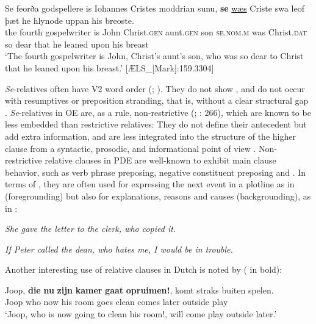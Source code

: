 \documentclass[output=paper,colorlinks,citecolor=brown]{langscibook}
\begin{document}
\ea\label{ex:los:5}
\gll Se feorða godspellere is Iohannes Cristes moddrian sunu, \textbf{se} \underline{wæs} Criste swa leof þæt he hlynode uppan his breoste.\\
the fourth gospelwriter is John Christ.\textsc{gen} aunt.\textsc{gen} son
\textsc{se.nom.m} was Christ.\textsc{dat} so dear that he leaned upon his breast \\
\glt ‘The fourth gospelwriter is John, Christ's aunt's son, who was so dear to Christ that he leaned upon his breast.' \hfill [ÆLS\_[Mark]:159.3304]
\z

\textit{Se}-relatives often have V2 word order (\citealt{Allen1977}; \citealt[149]{vanKemenade1987}). They do not show , and do not occur with resumptives or preposition stranding, that is, without a clear structural gap \citep{Wende1915, Allen1977}. \textit{Se}-relatives in OE are, as a rule, non-restrictive (\citealt[131--132, 138]{LosvanKemenade2018}; \citealt{Roma2007}: 266), which are known to be less embedded than restrictive relatives: They do not define their antecedent but add extra information, and are less integrated into the structure of the higher clause from a syntactic, prosodic, and informational point of view \citep[1034--1035]{HuddlestonPullum2002}. Non-restrictive relative clauses in PDE are well-known to exhibit main clause behavior, such as verb phrase preposing, negative constituent preposing and  \citep{Emonds1970, HooperHooper1973, Green1976, deVries2012, Heycock2017}. In terms of , they are often used for expressing the next event in a plotline as in  (foregrounding) but also for explanations, reasons and causes (backgrounding), as in :

\ea\label{ex:los:6}
{\itshape She gave the letter to the clerk, who copied it.} \hfill \citep[699]{Depraetere1996}
\z

\ea\label{ex:los:7}
{\itshape If Peter called the dean, who hates me, I would be in trouble.}\\ \hfill \citep[142]{JasinskajaPoschmann2020}
\z

Another interesting use of relative clauses in Dutch is noted by \citet[183]{deVries2012} ( in bold):

 \ea\label{ex:los:8}
\gll Joop, \textbf{die} \textbf{nu} \textbf{zijn} \textbf{kamer} \textbf{gaat} \textbf{opruimen!}, komt straks buiten spelen.\\
Joop who now his room goes clean comes later outside play\\
\glt ‘Joop, who is now going to clean his room!, will come play outside later.'
\z
\end{document}
